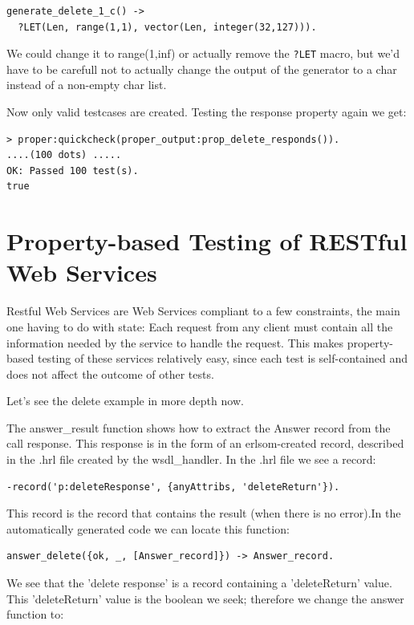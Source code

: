 \documentclass[submission,copyright,a4]{eptcs}
\newcommand{\LET}{\texttt{?LET}\xspace}
\begin{document}
\begin{lstlisting}
generate_delete_1_c() ->
  ?LET(Len, range(1,1), vector(Len, integer(32,127))).
\end{lstlisting}
We could change it to range(1,inf) or actually remove the \LET macro, but we'd have to be carefull not to actually change the output of the generator to a char instead of a non-empty char list.

Now only valid testcases are created. Testing the response property again we get:
\begin{lstlisting}
> proper:quickcheck(proper_output:prop_delete_responds()).
....(100 dots) .....
OK: Passed 100 test(s).
true
\end{lstlisting}

\section{Property-based Testing of RESTful Web Services}

Restful Web Services are Web Services compliant to a few constraints, the main one having to do with state: Each request from any client must contain all the information needed by the service to handle the request. This makes property-based testing of these services relatively easy, since each test is self-contained and does not affect the outcome of other tests. 

Let's see the delete example in more depth now. 

The answer\_result function shows how to extract the Answer record from the call response. This response is in the form of an erlsom-created record, described in the .hrl file created by the wsdl\_handler. In the .hrl file we see a record: 
\begin{lstlisting}
-record('p:deleteResponse', {anyAttribs, 'deleteReturn'}).
\end{lstlisting}

This record is the record that contains the result (when there is no error).In the automatically generated code we can locate this function:

\begin{lstlisting}
answer_delete({ok, _, [Answer_record]}) -> Answer_record.
\end{lstlisting}

We see that the 'delete response' is a record containing a 'deleteReturn' value. This 'deleteReturn' value is the boolean we seek; therefore we change the answer function to:
\end{document}
